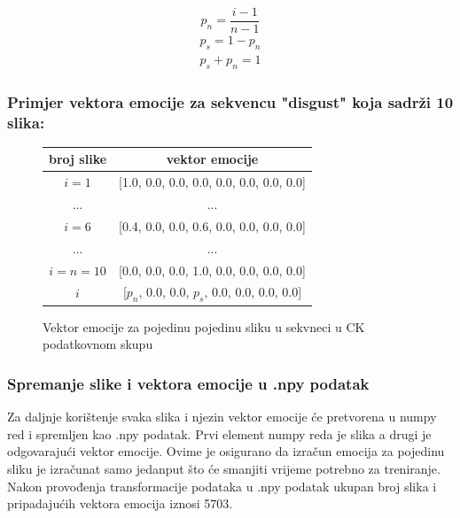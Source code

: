 \documentclass[times, utf8, zavrsni,numeric]{fer}
\begin{document}
\begin{equation}\label{eq:intensity_neutral}
	p_{n} = \dfrac{i-1}{n-1}	
\end{equation}
\begin{equation}\label{eq:intensity_seq}
\begin{split}
	p_{s} = 1 - p_{n}\\
	p_{s} + p_{n} = 1	
\end{split}
\end{equation}

\subsubsection{Primjer vektora emocije za sekvencu "disgust" koja sadrži 10 slika:}

\begin{figure}[H]
\centering
\begin{tabular}{|c|c|} 
\hline
broj slike & vektor emocije \\
\hline
$i = 1$ & [1.0, 0.0, 0.0, 0.0, 0.0, 0.0, 0.0, 0.0] \\
... & ... \\
$i = 6$ & [0.4, 0.0, 0.0, 0.6, 0.0, 0.0, 0.0, 0.0] \\
... & ... \\
$i = n = 10$ & [0.0, 0.0, 0.0, 1.0, 0.0, 0.0, 0.0, 0.0] \\
$i$ & [$p_n$, 0.0, 0.0, $p_s$, 0.0, 0.0, 0.0, 0.0]  \\
\hline
\end{tabular}
\caption{Vektor emocije za pojedinu pojedinu sliku u sekvneci u CK podatkovnom skupu}
\label{pic:ck_emotion_rise}
\end{figure}



\subsubsection{Spremanje slike i vektora emocije u .npy podatak}\label{self:npy_save}
Za daljnje korištenje svaka slika i njezin vektor emocije će pretvorena u numpy red \cite{numpy_array} i spremljen kao .npy podatak. Prvi element numpy reda je slika a drugi je odgovarajući vektor emocije. Ovime je osigurano da izračun emocija za pojedinu sliku je izračunat samo jedanput što će smanjiti vrijeme potrebno za treniranje. Nakon provođenja transformacije podataka u .npy podatak ukupan broj slika i pripadajućih vektora emocija iznosi 5703. 
\end{document}
